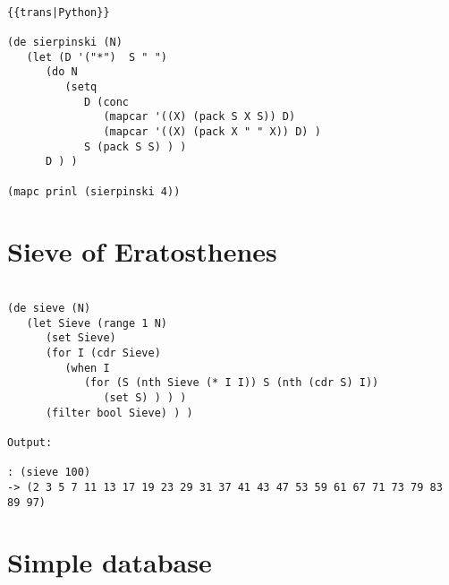 \begin{verbatim}

{{trans|Python}}

(de sierpinski (N)
   (let (D '("*")  S " ")
      (do N
         (setq
            D (conc
               (mapcar '((X) (pack S X S)) D)
               (mapcar '((X) (pack X " " X)) D) )
            S (pack S S) ) )
      D ) )

(mapc prinl (sierpinski 4))

\end{verbatim}

\section*{Sieve of Eratosthenes}

\begin{verbatim}

(de sieve (N)
   (let Sieve (range 1 N)
      (set Sieve)
      (for I (cdr Sieve)
         (when I
            (for (S (nth Sieve (* I I)) S (nth (cdr S) I))
               (set S) ) ) )
      (filter bool Sieve) ) )

Output:

: (sieve 100)
-> (2 3 5 7 11 13 17 19 23 29 31 37 41 43 47 53 59 61 67 71 73 79 83 89 97)

\end{verbatim}

\section*{Simple database}

